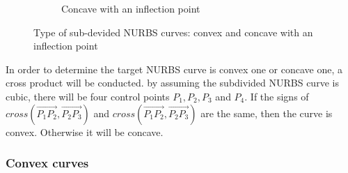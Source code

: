 \begin{figure}
\begin{subfigure}[b]{0.5\linewidth}
{            }
            \caption{Concave with an inflection point}
        \end{subfigure}
    \caption{Type of sub-devided NURBS curves: convex and concave with an inflection point}
    \label{qt_fig:iges_chord_ratio_nurbs}
    \end{figure}
%
In order to determine the target NURBS curve is convex one or concave one, a cross product will be conducted.
by assuming the subdivided NURBS curve is cubic, there will be four control points $P_1,P_2,P_3$ and $P_4$.
If the signs of $cross(\overrightarrow{P_1P_2},\overrightarrow{P_2P_3})$ and $cross(\overrightarrow{P_1P_2},\overrightarrow{P_2P_3})$ are the same, then the curve is convex.
Otherwise it will be concave.

\subsubsection{Convex curves}
\label{qt_ssc:convex_curves}
